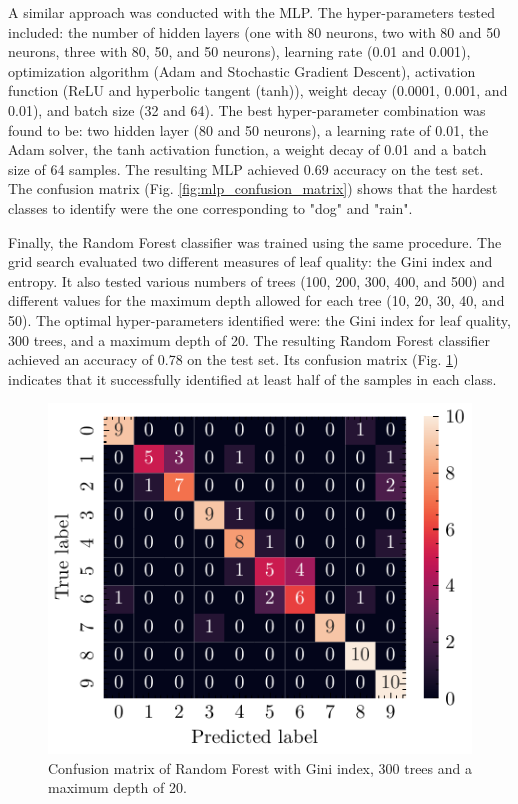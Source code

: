 \documentclass[journal]{IEEEtran}
\begin{document}
A similar approach was conducted with the MLP. The hyper-parameters tested included: the number of hidden layers (one with 80 neurons, two with 80 and 50 neurons, three with 80, 50, and 50 neurons), learning rate (0.01 and 0.001), optimization algorithm (Adam and Stochastic Gradient Descent), activation function (ReLU and hyperbolic tangent (tanh)), weight decay (0.0001, 0.001, and 0.01), and batch size (32 and 64). The best hyper-parameter combination was found to be: two hidden layer (80 and 50 neurons), a learning rate of 0.01, the Adam solver, the tanh activation function, a weight decay of 0.01 and a batch size of 64 samples.
The resulting MLP achieved 0.69 accuracy on the test set. The confusion matrix (Fig. \ref{fig:mlp_confusion_matrix}) shows that the hardest classes to identify were the one corresponding to "dog" and "rain".

Finally, the Random Forest classifier was trained using the same procedure. The grid search evaluated two different measures of leaf quality: the Gini index and entropy. It also tested various numbers of trees (100, 200, 300, 400, and 500) and different values for the maximum depth allowed for each tree (10, 20, 30, 40, and 50). The optimal hyper-parameters identified were: the Gini index for leaf quality, 300 trees, and a maximum depth of 20. The resulting Random Forest classifier achieved an accuracy of 0.78 on the test set. Its confusion matrix (Fig. \ref{fig:rf_confusion_matrix}) indicates that it successfully identified at least half of the samples in each class.
\begin{figure}[ht]
    \centering
    \includegraphics[width=\linewidth]{confusion_matrix_rf.pdf}
    \caption{Confusion matrix of Random Forest with Gini index, 300 trees and a maximum depth of 20.}
    \label{fig:rf_confusion_matrix}
\end{figure}
\end{document}
